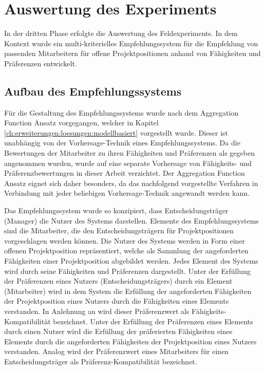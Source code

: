 \section{Auswertung des Experiments}
In der dritten Phase erfolgte die Auswertung des Feldexperiments.
In dem Kontext wurde ein multi-kriterielles Empfehlungssystem für die Empfehlung von passenden Mitarbeitern für offene Projektpositionen anhand von Fähigkeiten und Präferenzen entwickelt.

\subsection{Aufbau des Empfehlungssystems}
Für die Gestaltung des Empfehlungssystems wurde nach dem Aggregation Function Ansatz vorgegangen, welcher in Kapitel \ref{ch:erweiterungen:loesungen:modellbasiert} vorgestellt wurde.
Dieser ist unabhängig von der Vorhersage-Technik eines Empfehlungssystems.
Da die Bewertungen der Mitarbeiter zu ihren Fähigkeiten und Präferenzen als gegeben angenommen wurden, wurde auf eine separate Vorhersage von Fähigkeits- und Präferenzbewertungen in dieser Arbeit verzichtet.
Der Aggregation Function Ansatz eignet sich daher besonders, da das nachfolgend vorgestellte Verfahren in Verbindung mit jeder beliebigen Vorhersage-Technik angewandt werden kann.

Das Empfehlungssystem wurde so konzipiert, dass Entscheidungsträger (Manager) die Nutzer des Systems darstellen.
Elemente des Empfehlungssystems sind die Mitarbeiter, die den Entscheidungsträgern für Projektpositionen vorgeschlagen werden können.
Die Nutzer des Systems werden in Form einer offenen Projektposition repräsentiert, welche als Sammlung der angeforderten Fähigkeiten einer Projektposition abgebildet werden.
Jedes Element des Systems wird durch seine Fähigkeiten und Präferenzen dargestellt.
Unter der Erfüllung der Präferenzen eines Nutzers (Entscheidungsträgers) durch ein Element (Mitarbeiter) wird in dem System die Erfüllung der angeforderten Fähigkeiten der Projektposition eines Nutzers durch die Fähigkeiten eines Elements verstanden.
In Anlehnung an \textcite[S. 207ff.]{pizzato:2010} wird dieser Präferenzwert als Fähigkeits-Kompatibilität bezeichnet.
Unter der Erfüllung der Präferenzen eines Elements durch einen Nutzer wird die Erfüllung der präferierten Fähigkeiten eines Elements durch die angeforderten Fähigkeiten der Projektposition eines Nutzers verstanden.
Analog wird der Präferenzwert eines Mitarbeiters für einen Entscheidungsträger als Präferenz-Kompatibilität bezeichnet.

